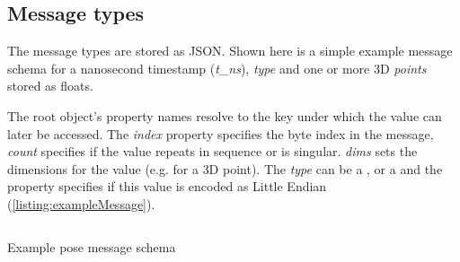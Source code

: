 \subsection{Message types}

The message types are stored as JSON. Shown here is a simple example message schema for a nanosecond timestamp (\emph{{t\_ns}}), \emph{type} and one or more \ac{3D} \emph{points} stored as floats.

The root object's property names resolve to the key under which the value can later be accessed.
The \emph{index} property specifies the byte index in the message, \emph{count} specifies if the value repeats in sequence or is singular. \emph{dims} sets the dimensions for the value (e.g.  for a \ac{3D} point).
The \emph{type} can be a ,  or a  and the property  specifies if this value is encoded as Little Endian (\autoref{listing:exampleMessage}).

\begin{listing}[!ht]
\inputminted{json}{04_Artefakte/03_Listings/example-pose-message.json}
\caption{Example pose message schema}
\label{listing:exampleMessage}
\end{listing}
